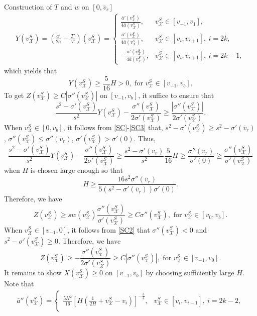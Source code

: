 \documentclass[12pt,reqno]{amsart}
\numberwithin{equation}{section}
\def\vsx{v^S_{\mathcal{X}}}
\def\avr{\overline{v}_r}
\begin{document}
\begin{part}{Construction of $T$ and $w$ on $[0,\avr]$}
\begin{align*}
	Y(\vsx)=\left(\frac{a'}{2a}-\frac{T'}{T}\right)(\vsx)=\begin{cases}
		\frac{\bar{a}'(\vsx)}{4\bar{a}(\vsx)},&\vsx \in [v_{-1},v_1],\\
		\frac{\bar{a}'(\vsx)}{4\bar{a}(\vsx)},&\vsx \in [v_{i},v_{i+1}], ~i=2k,\\
		-\frac{\bar{a}'(\vsx)}{4\bar{a}(\vsx)},&\vsx \in [v_{i},v_{i+1}], ~i=2k-1,
	\end{cases}
\end{align*}
which yields that 
\begin{equation}
	Y(\vsx)\geq \frac{5}{16}H>0,\text{ for } \vsx\in[v_{-1},v_b].
\end{equation}
To get $Z(\vsx)\geq C|\sigma''(\vsx)|$ on $[v_{-1},v_b]$, it suffice to ensure that
\begin{equation*}
	\frac{s^2-\sigma'(\vsx)}{s^2}Y(\vsx)-\frac{\sigma''(\vsx)}{2\sigma'(\vsx)}\geq \frac{|\sigma''(\vsx)|}{2\sigma'(\vsx)}.
\end{equation*}
When $\vsx\in[0,v_b]$, it follows from \eqref{SC}-\eqref{SC3} that, $s^2-\sigma'(\vsx)\geq s^2-\sigma'(\avr)$, $\sigma''(\vsx)\leq\sigma''(\avr)$, $\sigma'(\vsx)>\sigma'(0)$. Thus, 
\begin{equation*}
	\frac{s^2-\sigma'(\vsx)}{s^2}Y(\vsx)-\frac{\sigma''(\vsx)}{2\sigma'(\vsx)}\geq\frac{s^2-\sigma'(\avr)}{s^2}\frac{5}{16}H\geq \frac{\sigma''(\avr)}{\sigma'(0)}\geq \frac{\sigma''(\vsx)}{\sigma'(\vsx)}
\end{equation*}
when $H$ is chosen large enough so that
\begin{equation}
	H\geq \frac{16s^2\sigma''(\avr)}{5(s^2-\sigma'(\avr))\sigma'(0)}.
\end{equation}
Therefore, we have
\begin{equation}
	Z(\vsx)\geq sw(\vsx)\frac{\sigma''(\vsx)}{\sigma'(\vsx)}\geq C\sigma''(\vsx), \text{ for }\vsx\in[v_0,v_b].
\end{equation} 
When $\vsx\in[v_{-1},0]$, it follows from \eqref{SC2} that $\sigma''(\vsx)<0$ and $s^2-\sigma'(\vsx)\geq 0$. Therefore, 
we have
\begin{equation}
	Z(\vsx)\geq -\frac{\sigma''(\vsx)}{2\sigma'(\vsx)}\geq C|\sigma''(\vsx)|, \text{ for }\vsx\in[v_{-1},v_0].
\end{equation}
It remains to show $X(\vsx)\geq 0$ on $[v_{-1},v_b]$ by choosing sufficiently large $H$. Note that
\begin{align*}
	\bar{a}''(\vsx)=
	\begin{cases}
		\frac{5H^2}{16}[H(\frac{1}{2H}+\vsx-v_{i})]^{-\frac{3}{4}} ,&\vsx \in [v_{i},v_{i+1}], ~i=2k-2,\\

\end{cases}
\end{align*}
\end{part}
\end{document}
